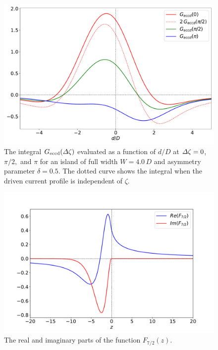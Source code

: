 \documentclass{iopjournal}
\begin{document}
{\begin{figure}
\centerline{\includegraphics[width=\textwidth]{Fig11.pdf}}
\caption{The integral $G_{\rm eccd}({\mit\Delta}\zeta)$ evaluated as a function of $d/D$ at ${\mit\Delta}\zeta = 0$, $\pi/2,$ and $\pi$ for an  island
of full width $W=4.0\,D$ and asymmetry parameter $\delta=0.5$. The dotted curve shows the integral when the driven current profile is independent of $\zeta$.\label{fig9}}
\end{figure}

\begin{figure}
\centerline{\includegraphics[width=\textwidth]{Fig20.pdf}}
\caption{The real and imaginary parts of the function $F_{7/2}(z)$.\label{f72}}
\end{figure}

}
\end{document}
